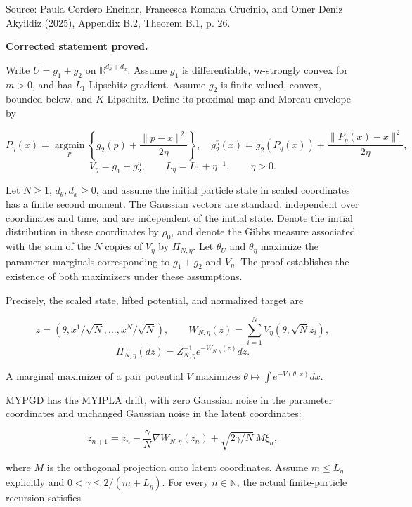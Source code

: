 \documentclass[11pt,a4paper]{report}
\begin{document}
Source: Paula Cordero Encinar, Francesca Romana Crucinio, and Omer Deniz Akyildiz (2025), Appendix B.2, Theorem B.1, p. 26.



\textbf{Corrected statement proved.}



Write \(U=g_1+g_2\) on \(\mathbb R^{d_\theta+d_x}\). Assume \(g_1\) is differentiable, \(m\)-strongly convex for \(m>0\), and has \(L_1\)-Lipschitz gradient. Assume \(g_2\) is finite-valued, convex, bounded below, and \(K\)-Lipschitz. Define its proximal map and Moreau envelope by


\[P_\eta(x)=\operatorname*{argmin}_p\left\{g_2(p)+\frac{\|p-x\|^2}{2\eta}\right\},\quad
g_2^\eta(x)=g_2(P_\eta(x))+\frac{\|P_\eta(x)-x\|^2}{2\eta},\]
\[V_\eta=g_1+g_2^\eta,\qquad L_\eta=L_1+\eta^{-1},\qquad\eta>0.\]


Let \(N\ge1\), \(d_\theta,d_x\ge0\), and assume the initial particle state in scaled coordinates has a finite second moment. The Gaussian vectors are standard, independent over coordinates and time, and are independent of the initial state. Denote the initial distribution in these coordinates by \(\rho_0\), and denote the Gibbs measure associated with the sum of the \(N\) copies of \(V_\eta\) by \(\Pi_{N,\eta}\). Let \(\theta_U\) and \(\theta_\eta\) maximize the parameter marginals corresponding to \(g_1+g_2\) and \(V_\eta\). The proof establishes the existence of both maximizers under these assumptions.



Precisely, the scaled state, lifted potential, and normalized target are


\[z=(\theta,x^1/\sqrt N,\ldots,x^N/\sqrt N),\qquad
W_{N,\eta}(z)=\sum_{i=1}^N V_\eta(\theta,\sqrt N z_i),\]
\[\Pi_{N,\eta}(dz)=Z_{N,\eta}^{-1}e^{-W_{N,\eta}(z)}dz.\]


A marginal maximizer of a pair potential \(V\) maximizes \(\theta\mapsto\int e^{-V(\theta,x)}dx\).



MYPGD has the MYIPLA drift, with zero Gaussian noise in the parameter coordinates and unchanged Gaussian noise in the latent coordinates:


\[z_{n+1}=z_n-\frac\gamma N\nabla W_{N,\eta}(z_n)+\sqrt{2\gamma/N}\,M\xi_n,\]


where \(M\) is the orthogonal projection onto latent coordinates. Assume \(m\le L_\eta\) explicitly and \(0<\gamma\le2/(m+L_\eta)\). For every \(n\in\mathbb N\), the actual finite-particle recursion satisfies
\end{document}
